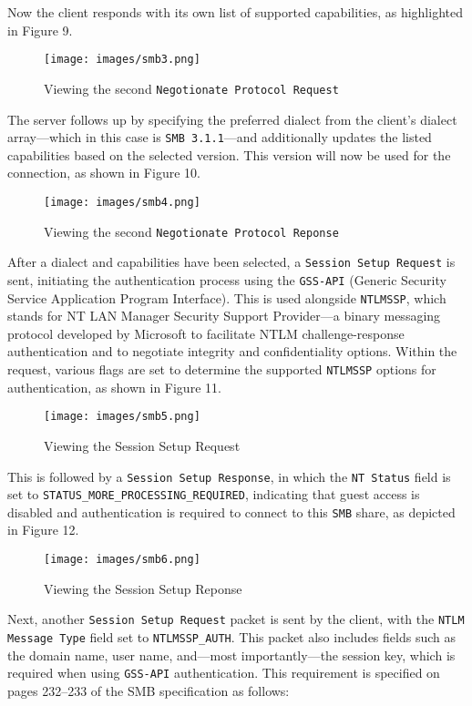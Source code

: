 \documentclass[a4paper]{article}
\newcommand{\abc}{\hfill \break}
\begin{document}
Now the client responds with its own list of supported capabilities, as highlighted in Figure 9.
\begin{figure}[h]
	\texttt{[image: images/smb3.png]}
	\centering
	\caption{Viewing the second \texttt{Negotionate Protocol Request}}
\end{figure}\abc
The server follows up by specifying the preferred dialect from the client’s dialect array—which in this case is \texttt{SMB 3.1.1}—and additionally updates the listed capabilities based on the selected version. This version will now be used for the connection, as shown in Figure 10. \cite{noauthor_ms-smb2_2024} \newpage
\begin{figure}[ht]
	\texttt{[image: images/smb4.png]}
	\centering
	\caption{Viewing the second \texttt{Negotionate Protocol Reponse}}
\end{figure}\abc
After a dialect and capabilities have been selected, a \texttt{Session Setup Request} is sent, initiating the authentication process using the \texttt{GSS-API} (Generic Security Service Application Program Interface). This is used alongside \texttt{NTLMSSP}, which stands for NT LAN Manager Security Support Provider—a binary messaging protocol developed by Microsoft to facilitate NTLM challenge-response authentication and to negotiate integrity and confidentiality options. \cite{noauthor_ms-smb2_2021-1,noauthor_ntlmssp_2020}
Within the request, various flags are set to determine the supported \texttt{NTLMSSP} options for authentication, as shown in Figure 11.
\begin{figure}[h]
	\texttt{[image: images/smb5.png]}
	\centering
	\caption{Viewing the Session Setup Request}
\end{figure}\abc \newpage\abc
This is followed by a \texttt{Session Setup Response}, in which the \texttt{NT Status} field is set to \texttt{STATUS\_MORE\_PROCESSING\_REQUIRED}, indicating that guest access is disabled and authentication is required to connect to this \texttt{SMB} share, as depicted in Figure 12.
\begin{figure}[h]
	\texttt{[image: images/smb6.png]}
	\centering
	\caption{Viewing the Session Setup Reponse}
\end{figure}\abc
Next, another \texttt{Session Setup Request} packet is sent by the client, with the \texttt{NTLM Message Type} field set to \texttt{NTLMSSP\_AUTH}. This packet also includes fields such as the domain name, user name, and—most importantly—the session key, which is required when using \texttt{GSS-API} authentication. This requirement is specified on pages 232–233 of the SMB specification as follows:\abc
\end{document}
